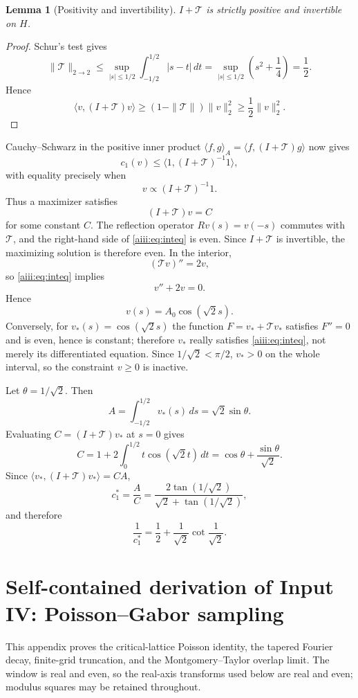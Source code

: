 \documentclass[11pt]{article}
\newtheorem{lemma}[theorem]{Lemma}
\begin{document}
\begin{lemma}[Positivity and invertibility]\label{aiii:lem:positive}
$I+\mathcal T$ is strictly positive and invertible on $H$.
\end{lemma}

\begin{proof}
Schur's test gives
\[
 \|\mathcal T\|_{2\to2}
 \le\sup_{|s|\le1/2}\int_{-1/2}^{1/2}|s-t|\,dt
 =\sup_{|s|\le1/2}\left(s^2+\frac14\right)=\frac12.
\]
Hence
\[
 \langle v,(I+\mathcal T)v\rangle
 \ge(1-\|\mathcal T\|)\|v\|_2^2
 \ge\frac12\|v\|_2^2.
\]
\end{proof}

Cauchy--Schwarz in the positive inner product
$\langle f,g\rangle_A=\langle f,(I+\mathcal T)g\rangle$ now gives
\[
 c_1(v)\le\langle1,(I+\mathcal T)^{-1}1\rangle,
\]
with equality precisely when
\[
 v\propto(I+\mathcal T)^{-1}1.
\]
Thus a maximizer satisfies
\begin{equation}\label{aiii:eq:inteq}
 (I+\mathcal T)v=C
\end{equation}
for some constant $C$.
The reflection operator $Rv(s)=v(-s)$ commutes with $\mathcal T$, and the
right-hand side of \eqref{aiii:eq:inteq} is even.  Since
$I+\mathcal T$ is invertible, the maximizing solution is therefore even.
In the interior,
\[
 (\mathcal Tv)''=2v,
\]
so \eqref{aiii:eq:inteq} implies
\[
 v''+2v=0.
\]
Hence
\[
 v(s)=A_0\cos(\sqrt2s).
\]
Conversely, for $v_*(s)=\cos(\sqrt2s)$ the function
$F=v_*+\mathcal Tv_*$ satisfies $F''=0$ and is even, hence is constant;
therefore $v_*$ really satisfies \eqref{aiii:eq:inteq}, not merely its
differentiated equation.  Since $1/\sqrt2<\pi/2$, $v_*>0$ on the whole
interval, so the constraint $v\ge0$ is inactive.

Let $\theta=1/\sqrt2$.  Then
\[
 A=\int_{-1/2}^{1/2}v_*(s)\,ds=\sqrt2\sin\theta.
\]
Evaluating $C=(I+\mathcal T)v_*$ at $s=0$ gives
\[
 C=1+2\int_0^{1/2}t\cos(\sqrt2t)\,dt
 =\cos\theta+\frac{\sin\theta}{\sqrt2}.
\]
Since $\langle v_*,(I+\mathcal T)v_*\rangle=CA$,
\[
 c_1^*=\frac{A}{C}
 =\frac{2\tan(1/\sqrt2)}{\sqrt2+\tan(1/\sqrt2)},
\]
and therefore
\begin{equation}\label{aiii:eq:cstar}
 \boxed{
 \frac1{c_1^*}
 =\frac12+\frac1{\sqrt2}\cot\frac1{\sqrt2}.
 }
\end{equation}



\section{Self-contained derivation of Input IV: Poisson--Gabor sampling}\label{app:inputIV}
This appendix proves the critical-lattice Poisson identity, the tapered
Fourier decay, finite-grid truncation, and the Montgomery--Taylor overlap
limit.  The window is real and even, so the real-axis transforms used below
are real and even; modulus squares may be retained throughout.
\end{document}
